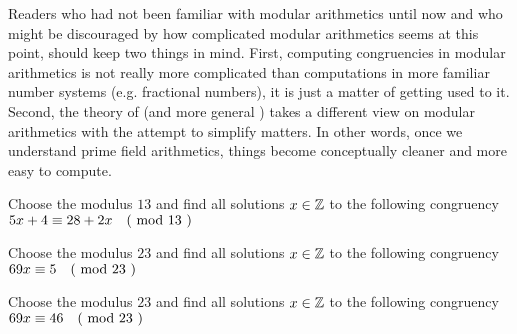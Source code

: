 Readers who had not been familiar with modular arithmetics until now and who might be discouraged by how complicated modular arithmetics seems at this point, should keep two things in mind. First, computing congruencies in modular arithmetics is not really more complicated than computations in more familiar number systems (e.g. fractional numbers), it is just a matter of getting used to it. Second, the theory of  (and more general ) takes a different view on modular arithmetics with the attempt to simplify matters. In other words, once we understand prime field arithmetics, things become conceptually cleaner and more easy to compute.
\begin{exercise}Choose the modulus $13$ and find all solutions $x\in \mathbb{Z}$ to the following congruency $5x+4 \equiv 28+2x \quad \text{( mod } 13 \text{ )}$
\end{exercise}
\begin{exercise}Choose the modulus $23$ and find all solutions $x\in \mathbb{Z}$ to the following congruency $69x \equiv 5 \quad \text{( mod } 23 \text{ )}$
\end{exercise}
\begin{exercise}Choose the modulus $23$ and find all solutions $x\in \mathbb{Z}$ to the following congruency $69x \equiv 46 \quad \text{( mod } 23 \text{ )}$
\end{exercise}
